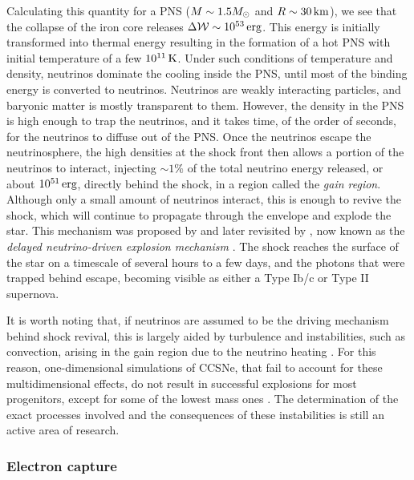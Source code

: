 Calculating this quantity for a PNS (\(M \sim 1.5M_{\odot}\) and \(R \sim 30\,\mathrm{km}\)), we see that the collapse of the iron core releases \(\Delta \mathcal{W} \sim 10^{53}\,\mathrm{erg}\). This energy is initially transformed into thermal energy resulting in the formation of a hot PNS with initial temperature of a few \(10^{11}\,\mathrm{K}\). Under such conditions of temperature and density, neutrinos dominate the cooling inside the PNS, until most of the binding energy is converted to neutrinos. Neutrinos are weakly interacting particles, and baryonic matter is mostly transparent to them. However, the density in the PNS is high enough to trap the neutrinos, and it takes time, of the order of seconds, for the neutrinos to diffuse out of the PNS. Once the neutrinos escape the neutrinosphere, the high densities at the shock front then allows a portion of the neutrinos to interact, injecting \(\sim1\%\) of the total neutrino energy released, or about \(10^{51}\,\mathrm{erg}\), directly behind the shock, in a region called the \emph{gain region}. Although only a small amount of neutrinos interact, this is enough to revive the shock, which will continue to propagate through the envelope and explode the star. This mechanism was proposed by \cite{ColgateWhite1966} and later revisited by \cite{Wilson1985}, now known as the \emph{delayed neutrino-driven explosion mechanism} \citep{Bethe1985}. The shock reaches the surface of the star on a timescale of several hours to a few days, and the photons that were trapped behind escape, becoming visible as either a Type Ib/c or Type II supernova.

It is worth noting that, if neutrinos are assumed to be the driving mechanism behind shock revival, this is largely aided by turbulence and instabilities, such as convection, arising in the gain region due to the neutrino heating \citep{Burrows1995}. For this reason, one-dimensional simulations of CCSNe, that fail to account for these multidimensional effects, do not result in successful explosions for most progenitors, except for some of the lowest mass ones \citep{Kitaura2006}. The determination of the exact processes involved and the consequences of these instabilities is still an active area of research.

\subsubsection{Electron capture} \label{sec:ecsne}

